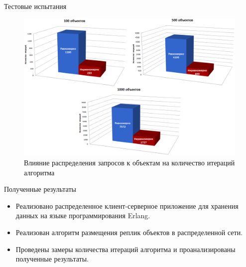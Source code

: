 \documentclass{beamer}
\begin{document}
\begin{frame}[fragile]{Тестовые испытания}
	\begin{figure}
		\includegraphics[scale=0.2]{img/histograms/dist.png}
		\caption{Влияние распределения запросов к объектам на количество итераций алгоритма}
	\end{figure}
\end{frame}


\begin{frame}{Полученные результаты}
	\begin{itemize}
		\item Реализовано распределенное клиент-серверное приложение для хранения данных на языке программирования Erlang. 
    	\item Реализован алгоритм размещения реплик объектов в распределенной сети. 
    	\item Проведены замеры количества итераций алгоритма и проанализированы полученные результаты.
	\end{itemize}
\end{frame}
\end{document}
